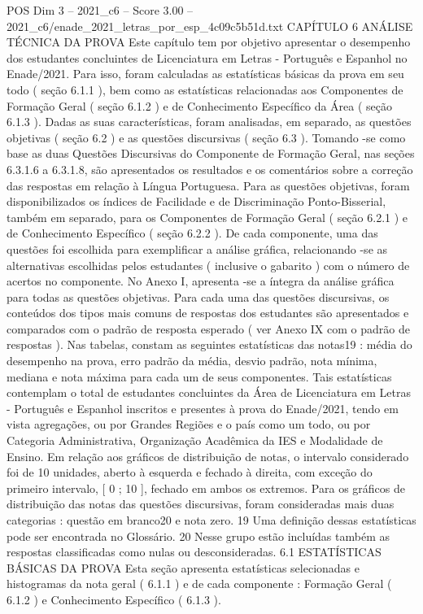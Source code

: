 \begin{textsample}{POS Dim 3 – 2021\_c6 – Score 3.00 – 2021\_c6/enade\_2021\_letras\_por\_esp\_4c09c5b51d.txt}  \label{ex:f3_pos_050}
CAPÍTULO 6 ANÁLISE TÉCNICA DA PROVA Este capítulo tem por objetivo apresentar o desempenho dos estudantes concluintes de Licenciatura em Letras - Português e Espanhol no Enade/2021.
Para isso, foram calculadas as estatísticas básicas da prova em seu todo ( seção 6.1.1 ), bem como as estatísticas relacionadas aos Componentes de Formação Geral ( seção 6.1.2 ) e de Conhecimento Específico da Área ( seção 6.1.3 ).
Dadas as suas características, foram analisadas, em separado, as questões objetivas ( seção 6.2 ) e as questões discursivas ( seção 6.3 ).
Tomando -se como base as duas Questões Discursivas do Componente de Formação Geral, nas seções 6.3.1.6 a 6.3.1.8, são apresentados os resultados e os comentários sobre a correção das respostas em relação à Língua Portuguesa.
Para as questões objetivas, foram disponibilizados os índices de Facilidade e de Discriminação Ponto-Bisserial, também em separado, para os Componentes de Formação Geral ( seção 6.2.1 ) e de Conhecimento Específico ( seção 6.2.2 ).
De cada componente, uma das questões foi escolhida para exemplificar a análise gráfica, relacionando -se as alternativas escolhidas pelos estudantes ( inclusive o gabarito ) com o número de acertos no componente.
No Anexo I, apresenta -se a íntegra da análise gráfica para todas as questões objetivas.
Para cada uma das questões discursivas, os conteúdos dos tipos mais comuns de respostas dos estudantes são apresentados e comparados com o padrão de resposta esperado ( ver Anexo IX com o padrão de respostas ).
Nas tabelas, constam as seguintes estatísticas das notas19 : média do desempenho na prova, erro padrão da média, desvio padrão, nota mínima, mediana e nota máxima para cada um de seus componentes.
Tais estatísticas contemplam o total de estudantes concluintes da Área de Licenciatura em Letras - Português e Espanhol inscritos e presentes à prova do Enade/2021, tendo em vista agregações, ou por Grandes Regiões e o país como um todo, ou por Categoria Administrativa, Organização Acadêmica da IES e Modalidade de Ensino.
Em relação aos gráficos de distribuição de notas, o intervalo considerado foi de 10 unidades, aberto à esquerda e fechado à direita, com exceção do primeiro intervalo, [ 0 ; 10 ], fechado em ambos os extremos.
Para os gráficos de distribuição das notas das questões discursivas, foram consideradas mais duas categorias : questão em branco20 e nota zero. 19 Uma definição dessas estatísticas pode ser encontrada no Glossário. 20 Nesse grupo estão incluídas também as respostas classificadas como nulas ou desconsideradas. 6.1 ESTATÍSTICAS BÁSICAS DA PROVA Esta seção apresenta estatísticas selecionadas e histogramas da nota geral ( 6.1.1 ) e de cada componente : Formação Geral ( 6.1.2 ) e Conhecimento Específico ( 6.1.3 ).

\end{textsample}
